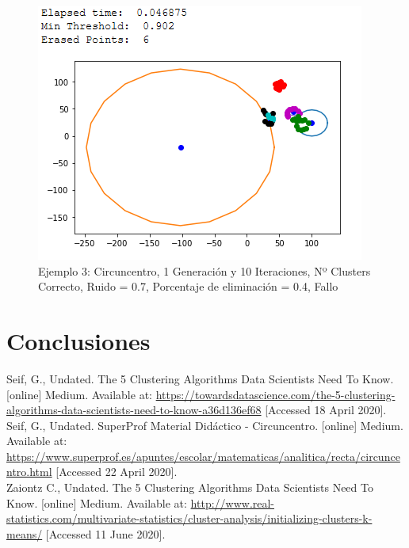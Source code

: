 \documentclass[conference,a4paper]{IEEEtran}
\begin{document}
\begin{figure}[H]
\centering
\includegraphics[scale=0.65]{Experimentacion/Ejemplo3/ej3_c_1_10_re_wrong}
\caption{Ejemplo 3: Circuncentro, 1 Generación y 10 Iteraciones,  Nº Clusters Correcto, Ruido = 0.7, Porcentaje de eliminación = 0.4, Fallo\\}
\end{figure}

\section{Conclusiones}


\clearpage
\begin{thebibliography}{9}
	
	\label{bib:georgeSeif}
	Seif, G., Undated. The 5 Clustering Algorithms Data Scientists Need To Know. [online] Medium. 
	Available at: \href{https://towardsdatascience.com/the-5-clustering-algorithms-data-scientists-need-to-know-a36d136ef68}{https://towardsdatascience.com/the-5-clustering-algorithms-data-scientists-need-to-know-a36d136ef68}
	[Accessed 18 April 2020].\\

	\label{bib:georgeSeif2}
	Seif, G., Undated. SuperProf Material Didáctico - Circuncentro. [online] Medium. 
	Available at: \href{https://www.superprof.es/apuntes/escolar/matematicas/analitica/recta/circuncentro.html}{https://www.superprof.es/apuntes/escolar/matematicas/analitica/recta/circuncentro.html}
	[Accessed 22 April 2020].\\
	
	\label{bib:clustering}
	Zaiontz C., Undated. The 5 Clustering Algorithms Data Scientists Need To Know. [online] Medium. 
	Available at: \href{ http://www.real-statistics.com/multivariate-statistics/cluster-analysis/initializing-clusters-k-means/}{ http://www.real-statistics.com/multivariate-statistics/cluster-analysis/initializing-clusters-k-means/}
	[Accessed 11 June 2020].

\end{thebibliography}
\end{document}
